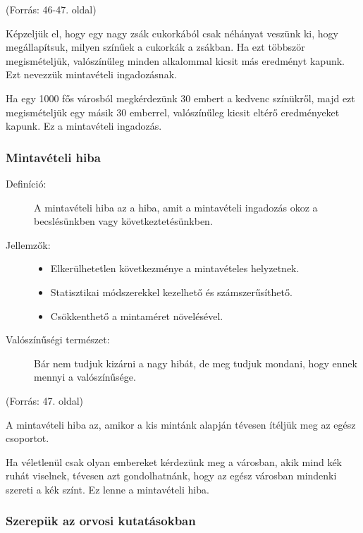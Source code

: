 \documentclass[a4paper,12pt]{article}
\begin{document}
    (Forrás: 46-47. oldal)

    Képzeljük el, hogy egy nagy zsák cukorkából csak néhányat veszünk ki, hogy megállapítsuk, milyen színűek a cukorkák a zsákban. Ha ezt többször megismételjük, valószínűleg minden alkalommal kicsit más eredményt kapunk. Ezt nevezzük mintavételi ingadozásnak.

    Ha egy 1000 fős városból megkérdezünk 30 embert a kedvenc színükről, majd ezt megismételjük egy másik 30 emberrel, valószínűleg kicsit eltérő eredményeket kapunk. Ez a mintavételi ingadozás.

    \subsubsection{Mintavételi hiba}

    \begin{description}
        \item[Definíció:] A mintavételi hiba az a hiba, amit a mintavételi ingadozás okoz a becslésünkben vagy következtetésünkben.

        \item[Jellemzők:]
        \begin{itemize}
            \item Elkerülhetetlen következménye a mintavételes helyzetnek.
            \item Statisztikai módszerekkel kezelhető és számszerűsíthető.
            \item Csökkenthető a mintaméret növelésével.
        \end{itemize}

        \item[Valószínűségi természet:] Bár nem tudjuk kizárni a nagy hibát, de meg tudjuk mondani, hogy ennek mennyi a valószínűsége.
    \end{description}
    (Forrás: 47. oldal)

    A mintavételi hiba az, amikor a kis mintánk alapján tévesen ítéljük meg az egész csoportot.

    Ha véletlenül csak olyan embereket kérdezünk meg a városban, akik mind kék ruhát viselnek, tévesen azt gondolhatnánk, hogy az egész városban mindenki szereti a kék színt. Ez lenne a mintavételi hiba.

    \subsubsection{Szerepük az orvosi kutatásokban}
\end{document}
